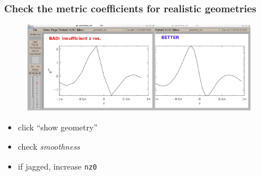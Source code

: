 \documentclass[9pt]{beamer}
\begin{document}

\begin{frame}
  \frametitle{Check the metric coefficients for realistic geometries}

\begin{figure}
\includegraphics[width=0.9\textwidth]{figs/geometry.jpg}
\end{figure}

\begin{block}{}
\begin{itemize}
 \item click ``show geometry''
 \item check {\em smoothness}
 \item if jagged, increase {\tt nz0}
\end{itemize}

\end{block}

\end{frame}

\end{document}
